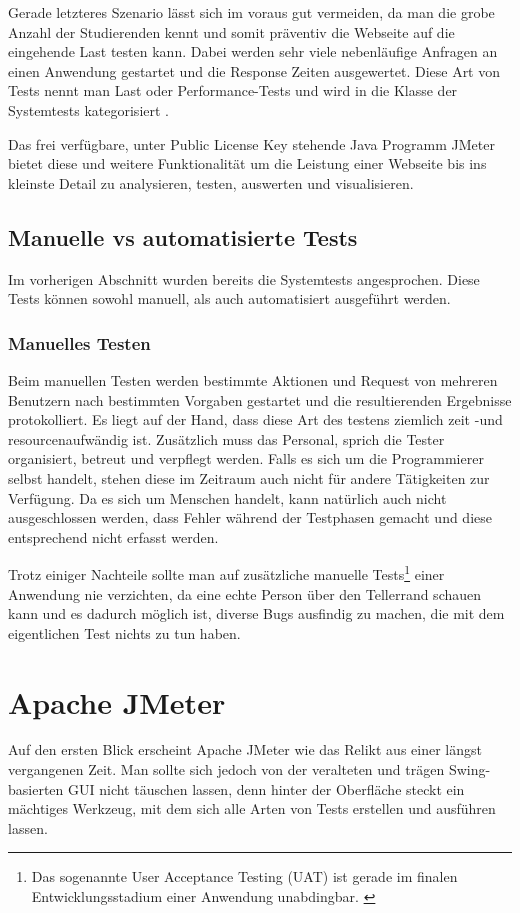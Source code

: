 \documentclass[a4paper,12pt]{article}
\begin{document}
Gerade letzteres Szenario lässt sich im voraus gut vermeiden, da man die grobe Anzahl der Studierenden kennt und somit präventiv die Webseite auf die eingehende Last testen kann. Dabei werden sehr viele nebenläufige Anfragen an einen Anwendung gestartet und die Response Zeiten ausgewertet. Diese Art von Tests nennt man Last oder Performance-Tests und wird in die Klasse der Systemtests kategorisiert \cite{online:LastUndPerformanceTest}. 

Das frei verfügbare, unter Public License Key stehende Java Programm JMeter bietet diese und weitere Funktionalität um die Leistung einer Webseite bis ins kleinste Detail zu analysieren, testen, auswerten und visualisieren.

\subsection{Manuelle vs automatisierte Tests}
Im vorherigen Abschnitt wurden bereits die Systemtests angesprochen. Diese Tests können sowohl manuell, als auch automatisiert ausgeführt werden. 

\subsubsection{Manuelles Testen}
Beim manuellen Testen werden bestimmte Aktionen und Request von mehreren Benutzern nach bestimmten Vorgaben gestartet und die resultierenden Ergebnisse protokolliert. Es liegt auf der Hand, dass diese Art des testens ziemlich zeit -und resourcenaufwändig ist. Zusätzlich muss das Personal, sprich die Tester organisiert, betreut und verpflegt werden. Falls es sich um die Programmierer selbst handelt, stehen diese im Zeitraum auch nicht für andere Tätigkeiten zur Verfügung. Da es sich um Menschen handelt, kann natürlich auch nicht ausgeschlossen werden, dass Fehler während der Testphasen gemacht und diese entsprechend nicht erfasst werden. \cite[p. 11]{book:ApacheJMeter}

Trotz einiger Nachteile sollte man auf zusätzliche manuelle Tests\footnote{Das sogenannte User Acceptance Testing (UAT) ist gerade im finalen Entwicklungsstadium einer Anwendung unabdingbar. \cite{online:wikiUAT}} einer Anwendung nie verzichten, da eine echte Person über den Tellerrand schauen kann und es dadurch möglich ist, diverse Bugs ausfindig zu machen, die mit dem eigentlichen Test nichts zu tun haben.




\section{Apache JMeter}
Auf den ersten Blick erscheint Apache JMeter wie das Relikt aus einer längst vergangenen Zeit. Man sollte sich jedoch von der veralteten und trägen Swing-basierten GUI nicht täuschen lassen, denn hinter der Oberfläche steckt ein mächtiges Werkzeug, mit dem sich alle Arten von Tests erstellen und ausführen lassen. \cite{online:heiseJMeterOderGatling}
\end{document}
